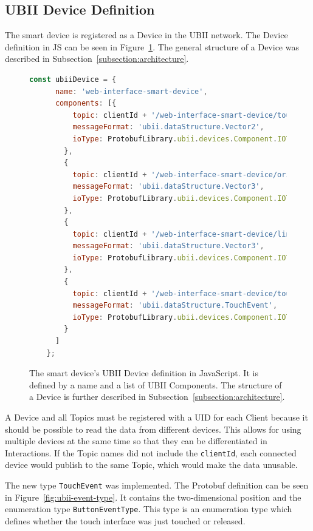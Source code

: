 \subsection{UBII Device Definition}\label{subsection:ubii-device-definition}

The smart device is registered as a Device in the \gls{UBII} network. The Device definition in \gls{JS} can be seen in Figure~\ref{fig:ubii-device-registration}. The general structure of a Device was described in Subsection~\ref{subsection:architecture}.

\begin{figure}[H]
	\begin{lstlisting}[language=JavaScript]
    const ubiiDevice = {
      name: 'web-interface-smart-device',
      components: [{
          topic: clientId + '/web-interface-smart-device/touch_position',
          messageFormat: 'ubii.dataStructure.Vector2',
          ioType: ProtobufLibrary.ubii.devices.Component.IOType.INPUT
        },
        {
          topic: clientId + '/web-interface-smart-device/orientation',
          messageFormat: 'ubii.dataStructure.Vector3',
          ioType: ProtobufLibrary.ubii.devices.Component.IOType.INPUT
        },
        {
          topic: clientId + '/web-interface-smart-device/linear_acceleration',
          messageFormat: 'ubii.dataStructure.Vector3',
          ioType: ProtobufLibrary.ubii.devices.Component.IOType.INPUT
        },
        {
          topic: clientId + '/web-interface-smart-device/touch_events',
          messageFormat: 'ubii.dataStructure.TouchEvent',
          ioType: ProtobufLibrary.ubii.devices.Component.IOType.INPUT
        }
      ]
    };
  \end{lstlisting}
	\caption[Protobuf definition of the smart device]{The smart device's \gls{UBII} Device definition in JavaScript. It is defined by a name and a list of \gls{UBII} Components. The structure of a Device is further described in Subsection~\ref{subsection:architecture}.}\label{fig:ubii-device-registration}
\end{figure}

A Device and all Topics must be registered with a \gls{UID} for each Client because it should be possible to read the data from different devices. This allows for using multiple devices at the same time so that they can be differentiated in Interactions. If the Topic names did not include the \lstinline{clientId}, each connected device would publish to the same Topic, which would make the data unusable.

The new type \lstinline{TouchEvent} was implemented. The \gls{Protobuf} definition can be seen in Figure~\ref{fig:ubii-event-type}. It contains the two-dimensional position and the enumeration type \mbox{\lstinline{ButtonEventType}}. This type is an enumeration type which defines whether the touch interface was just touched or released.

